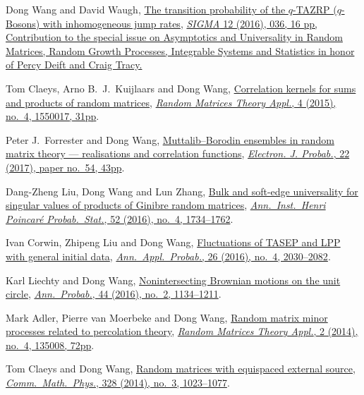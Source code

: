 \documentclass[12pt, letter]{article}
\begin{document}
\begin{etaremune}
\item
  Dong Wang and David Waugh, \href{http://arxiv.org/abs/1512.01612}{The transition probability of the $q$-TAZRP ($q$-Bosons) with inhomogeneous jump rates}, \href{https://doi.org/10.3842/SIGMA.2016.037}{\textit{SIGMA} 12 (2016), 036, 16 pp, Contribution to the special issue on Asymptotics and Universality in Random Matrices, Random Growth Processes, Integrable Systems and Statistics in honor of Percy Deift and Craig Tracy.}
\item 
  Tom Claeys, Arno B.~J.~Kuijlaars and Dong Wang, \href{http://arxiv.org/abs/1505.00610}{Correlation kernels for sums and products of random matrices}, \href{https://doi.org/10.1142/S2010326315500173}{\textit{Random Matrices Theory Appl.}, 4 (2015), no.\ 4, 1550017, 31pp}.
\item
  Peter J.~Forrester and Dong Wang, \href{http://arxiv.org/abs/1502.07147}{Muttalib--Borodin ensembles in random matrix theory --- realisations and correlation functions}, \href{https://doi.org/10.1214/17-EJP62}{\textit{Electron. J. Probab.}, 22 (2017), paper no.\ 54, 43pp}.
\item
  Dang-Zheng Liu, Dong Wang and Lun Zhang, \href{http://arxiv.org/abs/1412.6777}{Bulk and soft-edge universality for singular values of products of Ginibre random matrices}, \href{https://doi.org/10.1214/15-AIHP696}{\textit{Ann.\ Inst.\ Henri Poincar\'{e} Probab.\ Stat.}, 52 (2016), no.\ 4, 1734--1762}.
\item
  Ivan Corwin, Zhipeng Liu and Dong Wang, \href{http://arxiv.org/abs/1412.5087}{Fluctuations of TASEP and LPP with general initial data}, \href{https://doi.org/10.1214/15-AAP1139}{\textit{Ann.\ Appl.\ Probab.}, 26 (2016), no.\ 4, 2030--2082}.
\item
  Karl Liechty and Dong Wang, \href{http://arxiv.org/abs/1312.7390}{Nonintersecting Brownian motions on the unit circle}, \href{https://doi.org/10.1214/14-AOP998}{\textit{Ann.\ Probab.}, 44 (2016), no.\ 2, 1134--1211}.
\item 
  Mark Adler, Pierre van Moerbeke and Dong Wang,
  \href{http://arxiv.org/abs/1301.7017}{Random matrix minor processes related to percolation theory}, \href{https://doi.org/10.1142/S2010326313500081}{\textit{Random Matrices Theory Appl.}, 2 (2014), no.\ 4, 135008, 72pp}.
\item 
  Tom Claeys and Dong Wang,
  \href{http://arxiv.org/abs/1212.3768}{Random matrices with equispaced external source}, \href{https://doi.org/10.1007/s00220-014-1988-y}{\textit{Comm.\ Math.\ Phys.}, 328 (2014), no.\ 3, 1023--1077}.

\end{etaremune}
\end{document}
